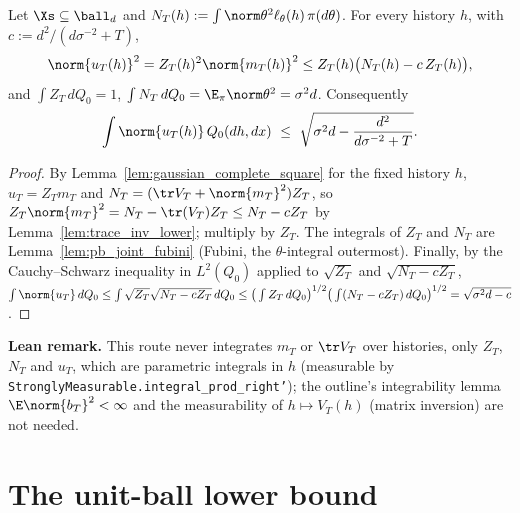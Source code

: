 \begin{lemma}\label{lem:posterior_second_moment}
\leanok
{}
Let $\Xs \subseteq \ball_d$ and $N_T(h) := \int\norm\theta^2\ell_\theta(h)\,\pi(d\theta)$. For
every history $h$, with $c := d^2/(d\sigma^{-2}+T)$,
\[
  \norm{u_T(h)}^2 = Z_T(h)^2\norm{m_T(h)}^2 \le Z_T(h)\big(N_T(h) - c\,Z_T(h)\big),
\]
and $\int Z_T\,dQ_0 = 1$, $\int N_T\,dQ_0 = \E_\pi\norm\theta^2 = \sigma^2d$. Consequently
\[
  \int\norm{u_T(h)}\,Q_0(dh,dx)\ \le\ \sqrt{\sigma^2d - \frac{d^2}{d\sigma^{-2}+T}} .
\]
\end{lemma}

\begin{proof}
\leanok
{}
By Lemma~\ref{lem:gaussian_complete_square} for the fixed history $h$,
$u_T = Z_Tm_T$ and $N_T = (\tr V_T + \norm{m_T}^2)Z_T$, so
$Z_T\norm{m_T}^2 = N_T - \tr(V_T)Z_T \le N_T - cZ_T$ by Lemma~\ref{lem:trace_inv_lower}; multiply
by $Z_T$. The integrals of $Z_T$ and $N_T$ are Lemma~\ref{lem:pb_joint_fubini} (Fubini, the
$\theta$-integral outermost). Finally, by the Cauchy--Schwarz inequality in $L^2(Q_0)$ applied
to $\sqrt{Z_T}$ and $\sqrt{N_T - cZ_T}$,
$\int\norm{u_T}\,dQ_0 \le \int\sqrt{Z_T}\sqrt{N_T-cZ_T}\,dQ_0
\le \big(\int Z_T\,dQ_0\big)^{1/2}\big(\int(N_T - cZ_T)\,dQ_0\big)^{1/2} = \sqrt{\sigma^2d - c}$.
\end{proof}

\textbf{Lean remark.} This route never integrates $m_T$ or $\tr V_T$ over histories, only
$Z_T$, $N_T$ and $u_T$, which are parametric integrals in $h$ (measurable by
\texttt{StronglyMeasurable.integral\_prod\_right'}); the outline's integrability lemma
$\E\norm{b_T}^2 < \infty$ and the measurability of $h\mapsto V_T(h)$ (matrix inversion) are
not needed.

\section{The unit-ball lower bound}
\label{sec:pre_bayes_ball}

